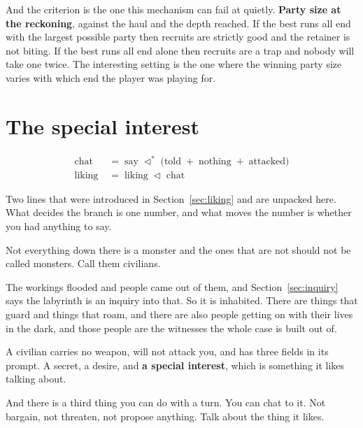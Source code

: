\documentclass[11pt,a4paper]{article}
\newcommand{\seqb}{\lhd^{\ast}}
\begin{document}
And the criterion is the one this mechanism can fail at quietly. \textbf{Party size at the
reckoning}, against the haul and the depth reached. If the best runs all end with the largest
possible party then recruits are strictly good and the retainer is not biting. If the best runs
all end alone then recruits are a trap and nobody will take one twice. The interesting setting is
the one where the winning party size varies with which end the player was playing for.

\newpage

\newpage

\section{The special interest}
\label{sec:chat}

\begin{center}
\begin{tcolorbox}[plainbg, colback=pale, width=0.86\textwidth]
\begin{align*}
\text{chat}   \;&=\; \text{say} \;\seqb\; \bigl( \text{told} \;+\; \text{nothing} \;+\; \text{attacked} \bigr) \\
\text{liking} \;&=\; \text{liking} \;\lhd\; \text{chat}
\end{align*}
\end{tcolorbox}
\end{center}

Two lines that were introduced in Section~\ref{sec:liking} and are unpacked here. What decides the
branch is one number, and what moves the number is whether you had anything to say.


Not everything down there is a monster and the ones that are not should not be called monsters.
Call them civilians.

The workings flooded and people came out of them, and Section~\ref{sec:inquiry} says the labyrinth
is an inquiry into that. So it is inhabited. There are things that guard and things that roam, and
there are also people getting on with their lives in the dark, and those people are the witnesses
the whole case is built out of.

A civilian carries no weapon, will not attack you, and has three fields in its prompt. A secret, a
desire, and \textbf{a special interest}, which is something it likes talking about.

And there is a third thing you can do with a turn. You can chat to it. Not bargain, not threaten,
not propose anything. Talk about the thing it likes.
\end{document}
